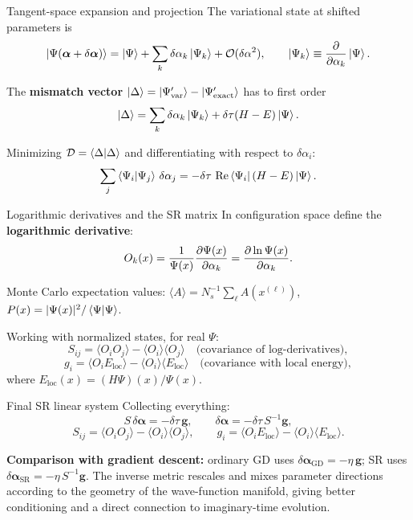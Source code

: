 \documentclass[aspectratio=169]{beamer}
\newcommand{\Eloc}{E_{\mathrm{loc}}}
\begin{document}
\begin{frame}{Tangent-space expansion and projection}
The variational state at shifted parameters is
\[
\ket{\Psi(\bm{\alpha}+\delta\bm{\alpha})}
=\ket{\Psi}+\sum_k\delta\alpha_k\ket{\Psi_k}+\mathcal{O}(\delta\alpha^2),
\qquad
\ket{\Psi_k}\equiv\pdv{}{\alpha_k}\ket{\Psi}.
\]

The \textbf{mismatch vector}
\(\ket{\Delta}=\ket{\Psi_{\mathrm{var}}'}-\ket{\Psi_{\mathrm{exact}}'}\)
has to first order
\[
\ket{\Delta}
=\sum_k\delta\alpha_k\ket{\Psi_k}+\delta\tau(H-E)\ket{\Psi}.
\]

Minimizing \(\mathcal{D}=\braket{\Delta}{\Delta}\) and differentiating
with respect to \(\delta\alpha_i\):
\[
\sum_j\braket{\Psi_i}{\Psi_j}\,\delta\alpha_j
=-\delta\tau\,\Re\bra{\Psi_i}(H-E)\ket{\Psi}.
\]
\end{frame}

\begin{frame}{Logarithmic derivatives and the SR matrix}
In configuration space define the \textbf{logarithmic derivative}:
\[
O_k(x)
=\frac{1}{\Psi(x)}\pdv{\Psi(x)}{\alpha_k}
=\pdv{\ln\Psi(x)}{\alpha_k}.
\]

Monte Carlo expectation values:
\(
\langle A\rangle=N_s^{-1}\sum_\ell A(x^{(\ell)})
\),
\;
\(
P(x)=|\Psi(x)|^2/\braket{\Psi}{\Psi}
\).

\medskip

Working with normalized states, for real \(\Psi\):
\[
S_{ij}
=\langle O_i O_j\rangle-\langle O_i\rangle\langle O_j\rangle
\quad\text{(covariance of log-derivatives)},
\]
\[
g_i
=\langle O_i\Eloc\rangle-\langle O_i\rangle\langle\Eloc\rangle
\quad\text{(covariance with local energy)},
\]
where \(\Eloc(x)=(H\Psi)(x)/\Psi(x)\).
\end{frame}

\begin{frame}{Final SR linear system}
Collecting everything:
\[
\boxed{
S\,\delta\bm{\alpha}=-\delta\tau\,\bm{g},
\qquad
\delta\bm{\alpha}=-\delta\tau\,S^{-1}\bm{g},
}
\]
\[
S_{ij}=\langle O_iO_j\rangle-\langle O_i\rangle\langle O_j\rangle,
\qquad
g_i=\langle O_i\Eloc\rangle-\langle O_i\rangle\langle\Eloc\rangle.
\]

\medskip

\textbf{Comparison with gradient descent:}
ordinary GD uses \(\delta\bm{\alpha}_{\mathrm{GD}}=-\eta\,\bm{g}\);
SR uses \(\delta\bm{\alpha}_{\mathrm{SR}}=-\eta\,S^{-1}\bm{g}\).
The inverse metric rescales and mixes parameter directions according
to the geometry of the wave-function manifold, giving better conditioning
and a direct connection to imaginary-time evolution.
\end{frame}
\end{document}
